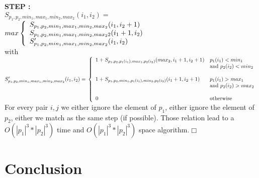 \documentclass[a4paper]{llncs}
\begin{document}
	\textbf{STEP :} \\	
	
	$S_{p_1,p_2,min_1,max_1,min_2,max_2}(i_1,i_2) =$\\
	\indent $ max \left\{ 
			\begin{array}{l l}
				S_{p_1,p_2,min_1,max_1,min_2,max_2}(i_1,i_2+1) \\
				S_{p_1,p_2,min_1,max_1,min_2,max_22}(i_1+1,i_2) \\
				S'_{p_1,p_2,min_1,max_1,min_2,max_2}(i_1,i_2)
			\end{array} \right. $\vspace{20pt}\\	
	
	with 
	$S'_{p_1,p_2,min_1,max_1,min_2,max_2}(i_1,i_2)=\\ \left\{ 
				\begin{array}{l l}
					1+S_{p_1,p_2,p_1(i_1),max_1,p_2(i_2)}(max_2,i_1+1,i_2+1)  & \text{$p_1(i_1)<min_1$ } \\
					& \text{and $p_2(i_2)<min_2$} \\
					&\\
					1+S_{p_1,p_2,min_1,p_1(i_1),min_2,p_2(i_2)}(i_1+1,i_2+1)  & \text{$p_1(i_1)>max_1$ } \\	
					&\text{and $p_2(i_2)>max_2$}\\	
					&\\	
					0 & \text{otherwise}\\							
				\end{array} \right.$\\
				
	For every pair $i,j$ we either ignore the element of $p_1$,
	either ignore the element of $p_2$, 
	either we match as the same step (if possible).
	Those relation lead to a $O(|p_1|^3*|p_2|^3)$ time and $O(|p_1|^3*|p_2|^3)$ space algorithm.$\Box$ 		



			
%		
%		
	
	
		
	\section{Conclusion}
		


		  					
{}
	
			
				      
\end{document}
